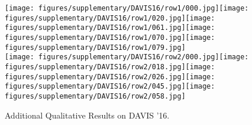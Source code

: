 \documentclass{bmvc2k}
\begin{document}
\vspace{-8pt}
\begin{figure}[h]
\centering
\texttt{[image: figures/supplementary/DAVIS16/row1/000.jpg]}\hspace{1px}\texttt{[image: figures/supplementary/DAVIS16/row1/020.jpg]}\hspace{1px}\texttt{[image: figures/supplementary/DAVIS16/row1/061.jpg]}\hspace{1px}\texttt{[image: figures/supplementary/DAVIS16/row1/070.jpg]}\hspace{1px}\texttt{[image: figures/supplementary/DAVIS16/row1/079.jpg]}\\
\texttt{[image: figures/supplementary/DAVIS16/row2/000.jpg]}\hspace{1px}\texttt{[image: figures/supplementary/DAVIS16/row2/018.jpg]}\hspace{1px}\texttt{[image: figures/supplementary/DAVIS16/row2/026.jpg]}\hspace{1px}\texttt{[image: figures/supplementary/DAVIS16/row2/045.jpg]}\hspace{1px}\texttt{[image: figures/supplementary/DAVIS16/row2/058.jpg]}\\
  \caption{Additional Qualitative Results on DAVIS '16.}
 \end{figure}
 \vspace{-12pt}
\end{document}
